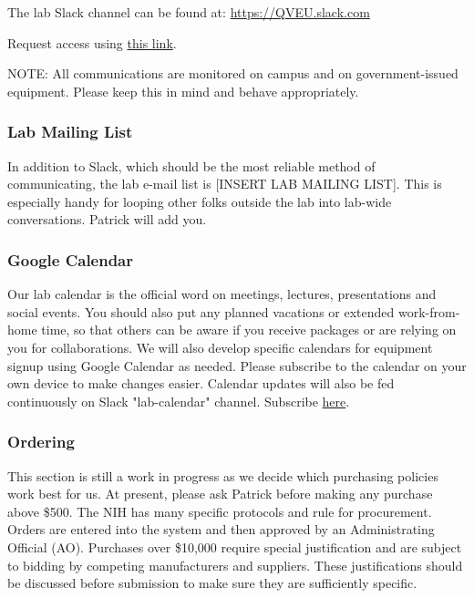 \documentclass[10pt, a4paper, twocolumn]{article} %
\begin{document}
The lab Slack channel can be found at: \href{https://QVEU.slack.com}{https://QVEU.slack.com}\newline

Request access using \href{https://join.slack.com/t/qveu/shared_invite/zt-sspu46d0-mJUV8OjwjOoJTaFyPKGlZg}{this link}.\newline

NOTE: All communications are monitored on campus and on government-issued equipment. Please keep this in mind and behave appropriately.

\subsubsection{Lab Mailing List}
In addition to Slack, which should be the most reliable method of communicating, the lab e-mail list is [INSERT LAB MAILING LIST]. This is especially handy for looping other folks outside the lab into lab-wide conversations. Patrick will add you.

\subsubsection{Google Calendar}
Our lab calendar is the official word on meetings, lectures, presentations and social events. You should also put any planned vacations or extended work-from-home time, so that others can be aware if you receive packages or are relying on you for collaborations. We will also develop specific calendars for equipment signup using Google Calendar as needed. Please subscribe to the calendar on your own device to make changes easier. Calendar updates will also be fed continuously on Slack "lab-calendar" channel. Subscribe \href{https://calendar.google.com/calendar/u/0?cid=dGhlcXZldUBnbWFpbC5jb20z}{here}.

\subsubsection{Ordering}
 This section is still a work in progress as we decide which purchasing policies work best for us. At present, please ask Patrick before making any purchase above \$500. The NIH has many specific protocols and rule for procurement. Orders are entered into the system and then approved by an Administrating Official (AO). Purchases over \$10,000 require special justification and are subject to bidding by competing manufacturers and suppliers. These justifications should be discussed before submission to make sure they are sufficiently specific.
\end{document}
